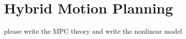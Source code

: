\section{Hybrid Motion Planning}
\label{sec:Review}
{\color{red} please write the MPC theory and write the nonlinear model}